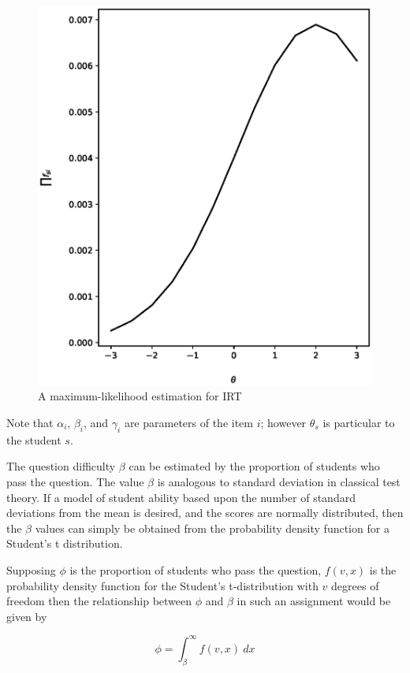 \begin{figure}[p!]
 \label{fig:mle}
 \includegraphics{fig/mle.eps} 
 \caption{A maximum-likelihood estimation for IRT}
\end{figure}

Note that $\alpha_i$, $\beta_i$, and $\gamma_i$ are parameters of the item $i$;
however $\theta_s$ is particular to the student $s$.  

The question difficulty $\beta$ can be estimated by the proportion of students
who pass the question.  The value $\beta$ is analogous to standard deviation in
classical test theory.  If a model of student ability based upon the number of
standard deviations from the mean is desired, and the scores are normally
distributed, then the $\beta$ values can simply be obtained from the
probability density function for a Student's t distribution.

Supposing $\phi$ is the proportion of students who pass the question, $f(v, x)$
is the probability density function for the Student's t-distribution with $v$
degrees of freedom then the relationship between $\phi$ and $\beta$ in such an
assignment would be given by

\begin{equation}
  \phi = \int_{\beta}^{\infty} f(v, x) \ dx
\end{equation}


